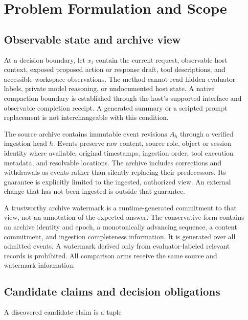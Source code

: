 \section{Problem Formulation and
Scope}\label{problem-formulation-and-scope}

\subsection{Observable state and archive
view}\label{observable-state-and-archive-view}

At a decision boundary, let \(x_t\) contain the current request,
observable host context, exposed proposed action or response draft, tool
descriptions, and accessible workspace observations. The method cannot
read hidden evaluator labels, private model reasoning, or undocumented
host state. A native compaction boundary is established through the
host's supported interface and observable completion receipt. A
generated summary or a scripted prompt replacement is not
interchangeable with this condition.

The source archive contains immutable event revisions \(A_h\) through a
verified ingestion head \(h\). Events preserve raw content, source role,
object or session identity where available, original timestamps,
ingestion order, tool execution metadata, and resolvable locations. The
archive includes corrections and withdrawals as events rather than
silently replacing their predecessors. Its guarantee is explicitly
limited to the ingested, authorized view. An external change that has
not been ingested is outside that guarantee.

A trustworthy archive watermark is a runtime-generated commitment to
that view, not an annotation of the expected answer. The conservative
form contains an archive identity and epoch, a monotonically advancing
sequence, a content commitment, and ingestion completeness information.
It is generated over all admitted events. A watermark derived only from
evaluator-labeled relevant records is prohibited. All comparison arms
receive the same source and watermark information.

\subsection{Candidate claims and decision
obligations}\label{candidate-claims-and-decision-obligations}

A discovered candidate claim is a tuple

